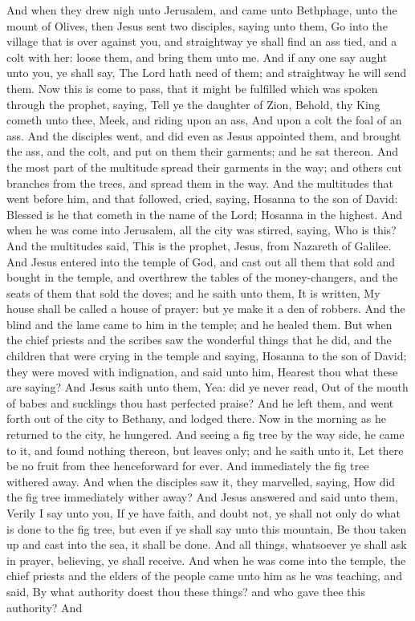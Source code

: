 And when they drew nigh unto Jerusalem, and came unto Bethphage, unto the mount of Olives, then Jesus sent two disciples, saying unto them, Go into the village that is over against you, and straightway ye shall find an ass tied, and a colt with her: loose them, and bring them unto me. And if any one say aught unto you, ye shall say, The Lord hath need of them; and straightway he will send them. Now this is come to pass, that it might be fulfilled which was spoken through the prophet, saying,  Tell ye the daughter of Zion, Behold, thy King cometh unto thee, Meek, and riding upon an ass, And upon a colt the foal of an ass.  And the disciples went, and did even as Jesus appointed them, and brought the ass, and the colt, and put on them their garments; and he sat thereon. And the most part of the multitude spread their garments in the way; and others cut branches from the trees, and spread them in the way. And the multitudes that went before him, and that followed, cried, saying, Hosanna to the son of David: Blessed is he that cometh in the name of the Lord; Hosanna in the highest. And when he was come into Jerusalem, all the city was stirred, saying, Who is this? And the multitudes said, This is the prophet, Jesus, from Nazareth of Galilee.  And Jesus entered into the temple of God, and cast out all them that sold and bought in the temple, and overthrew the tables of the money-changers, and the seats of them that sold the doves; and he saith unto them, It is written, My house shall be called a house of prayer: but ye make it a den of robbers. And the blind and the lame came to him in the temple; and he healed them. But when the chief priests and the scribes saw the wonderful things that he did, and the children that were crying in the temple and saying, Hosanna to the son of David; they were moved with indignation, and said unto him, Hearest thou what these are saying? And Jesus saith unto them, Yea: did ye never read, Out of the mouth of babes and sucklings thou hast perfected praise? And he left them, and went forth out of the city to Bethany, and lodged there.  Now in the morning as he returned to the city, he hungered. And seeing a fig tree by the way side, he came to it, and found nothing thereon, but leaves only; and he saith unto it, Let there be no fruit from thee henceforward for ever. And immediately the fig tree withered away. And when the disciples saw it, they marvelled, saying, How did the fig tree immediately wither away? And Jesus answered and said unto them, Verily I say unto you, If ye have faith, and doubt not, ye shall not only do what is done to the fig tree, but even if ye shall say unto this mountain, Be thou taken up and cast into the sea, it shall be done. And all things, whatsoever ye shall ask in prayer, believing, ye shall receive.  And when he was come into the temple, the chief priests and the elders of the people came unto him as he was teaching, and said, By what authority doest thou these things? and who gave thee this authority? And 